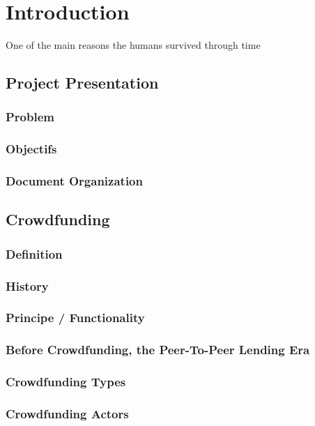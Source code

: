 

\chapter*{Introduction}
\label{chap:general_intorduction}
%
%

One of the main reasons the humans survived through time 

\section*{ Project Presentation }
\subsection*{Problem}
\subsection*{Objectifs}
\subsection*{Document Organization}


\section*{Crowdfunding}
\subsection*{Definition}
\subsection*{History}
\subsection*{Principe / Functionality }
\subsection*{ Before Crowdfunding, the Peer-To-Peer Lending Era }
\subsection*{ Crowdfunding Types }
\subsection*{ Crowdfunding Actors }
